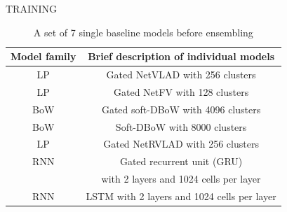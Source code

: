 \documentclass[final]{beamer}
\newlength{\colwidth}
\begin{document}
\begin{frame}[t]
\begin{columns}[t]
\begin{column}{\colwidth}
\begin{block}{TRAINING}
	    \begin{table}[h!]
  \begin{center}
    \begin{tabular}{ c | c }
    \toprule
      \textbf{Model family} & \textbf{Brief description of individual models}  \\
    \midrule
            LP & Gated NetVLAD with 256 clusters \\
    \hline
            LP & Gated NetFV with 128 clusters \\
    \hline
            BoW & Gated soft-DBoW with 4096 clusters \\
    \hline
            BoW & Soft-DBoW with 8000 clusters \\
    \hline
            LP &  Gated NetRVLAD with 256 clusters \\
    \hline
            RNN & Gated recurrent unit (GRU) \\
            & with 2 layers and 1024 cells per layer \\
    \hline
            RNN & LSTM with 2 layers and 1024 cells per layer \\
    \bottomrule
    \end{tabular}
    \caption{A set of 7 single baseline models before ensembling}
    \label{tab:single_models}
  \end{center}
\end{table}


\end{block}
\end{column}
\end{columns}
\end{frame}
\end{document}
